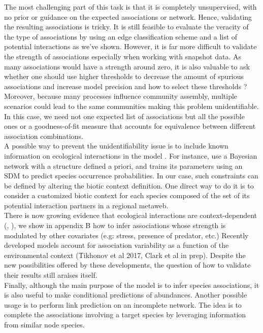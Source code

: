 \documentclass[10pt,a4paper]{article}
\begin{document}
The most challenging part of this task is that it is completely unsupervised, with no prior or guidance on the expected associations or network. Hence, validating the resulting associations is tricky. It is still feasible to evaluate the veracity of the type of associations by using an edge classification scheme and a list of potential interactions as we've shown. However, it is far more difficult to validate the strength of associations especially when working with snapshot data. As many associations would have a strength around zero, it is also valuable to ask whether one should use higher thresholds to decrease the amount of spurious associations and increase model precision and how to select these thresholds ? Moreover, because many processes influence community assembly, multiple scenarios could lead to the same communities making this problem unidentifiable. In this case, we need not one expected list of associations but all the possible ones or a goodness-of-fit measure that accounts for equivalence between different association combinations. \\

A possible way to prevent the unidentifiability issue is to include known information on ecological interactions in the model \cite{cazelles2016theory}. For instance, \cite{staniczenko2017linking} use a Bayesian network with a structure defined a priori, and trains its parameters using an SDM to predict species occurrence probabilities. In our case, such constraints can be defined by altering the biotic context definition. One direct way to do it is to consider a customized biotic context for each species composed of the set of its potential interaction partners in a regional metaweb. \\

There is now growing evidence that ecological interactions are context-dependent (\cite{poisot2015beyond}, \cite{tikhonov2017using}), we show in appendix B how to infer associations whose strength is modulated by other covariates (e.g: stress, presence of predator, etc.) Recently developed models account for association variability as a function of the environmental context (Tikhonov et al 2017, Clark et al in prep). Despite the new possibilities offered by these developments, the question of how to validate their results still araises itself. \\

Finally, although the main purpose of the model is to infer species associations, it is also useful to make conditional predictions of abundances. Another possible usage is to perform link prediction on an incomplete network. The idea is to complete the associations involving a target species by leveraging information from similar node species. \\ 
 
\end{document}
